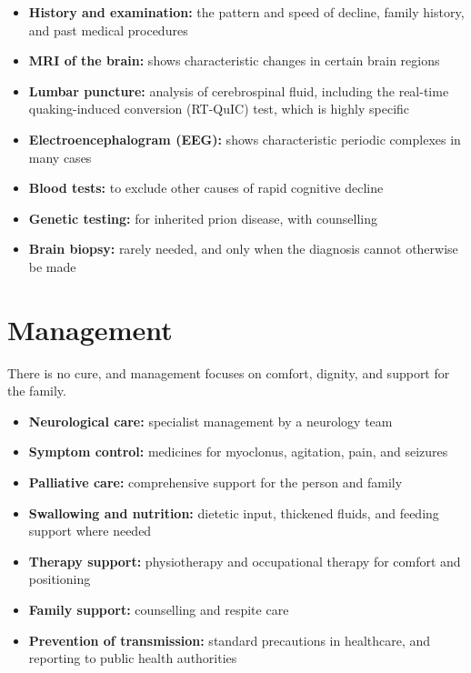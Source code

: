 \begin{itemize}
    \item \textbf{History and examination:} the pattern and speed of decline, family history, and past medical procedures
    \item \textbf{MRI of the brain:} shows characteristic changes in certain brain regions
    \item \textbf{Lumbar puncture:} analysis of cerebrospinal fluid, including the real-time quaking-induced conversion (RT-QuIC) test, which is highly specific
    \item \textbf{Electroencephalogram (EEG):} shows characteristic periodic complexes in many cases
    \item \textbf{Blood tests:} to exclude other causes of rapid cognitive decline
    \item \textbf{Genetic testing:} for inherited prion disease, with counselling
    \item \textbf{Brain biopsy:} rarely needed, and only when the diagnosis cannot otherwise be made
\end{itemize}

\section*{Management}
There is no cure, and management focuses on comfort, dignity, and support for the family.

\begin{itemize}
    \item \textbf{Neurological care:} specialist management by a neurology team
    \item \textbf{Symptom control:} medicines for myoclonus, agitation, pain, and seizures
    \item \textbf{Palliative care:} comprehensive support for the person and family
    \item \textbf{Swallowing and nutrition:} dietetic input, thickened fluids, and feeding support where needed
    \item \textbf{Therapy support:} physiotherapy and occupational therapy for comfort and positioning
    \item \textbf{Family support:} counselling and respite care
    \item \textbf{Prevention of transmission:} standard precautions in healthcare, and reporting to public health authorities
\end{itemize}

